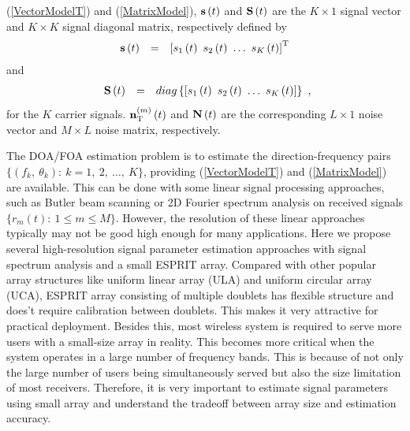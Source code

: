 \documentclass[a4paper,10pt,fleqn,twocolumn]{IEEEtran}
\newcommand{\bs}{{\bf s}}
\newcommand{\bn}{{\bf n}}
\newcommand{\bS}{{\bf S}}
\newcommand{\bN}{{\bf N}}
\begin{document}
(\ref{VectorModelT}) and (\ref{MatrixModel}), $\bs\left(t\right)$
and $\bS\left(t\right)$ are the $K\times 1$ signal vector and
$K\times K$ signal diagonal matrix, respectively defined by
\begin{equation}
\begin{array}{rcl}
\bs\left(t\right)&=&\left[s_{1}\left(t\right)\
s_{2}\left(t\right)\ \ldots\ s_{K}\left(t\right)\right]^{\rm T}
\end{array}
\end{equation}
\noindent and
\begin{equation}
\begin{array}{rcl}
\bS\left(t\right)&=&\mbox{diag}\left\{\left[s_{1}\left(t\right)\
s_{2}\left(t\right)\ \ldots\ s_{K}\left(t\right)\right]\right\}
\end{array},
\end{equation}
\noindent for the $K$ carrier signals. $\bn_{\rm
T}^{(m)}\left(t\right)$ and $\bN\left(t\right)$ are the
corresponding $L\times 1$ noise vector and $M\times L$ noise
matrix, respectively.

The DOA/FOA estimation problem is to estimate the
direction-frequency pairs $\{\left(f_{k},\ \theta_{k}\right):\
k=1,\ 2,\ \ldots,\ K\}$, providing (\ref{VectorModelT}) and
(\ref{MatrixModel}) are available. This can be done with some
linear signal processing approaches, such as Butler beam scanning
or 2D Fourier spectrum analysis on received signals
$\{r_{m}\left(t\right):\ 1\leq m\leq M \}$. However, the
resolution of these linear approaches typically may not be good
high enough for many applications. Here we propose several
high-resolution signal parameter estimation approaches with signal
spectrum analysis and a small ESPRIT array. Compared with other
popular array structures like uniform linear array (ULA) and
uniform circular array (UCA), ESPRIT array consisting of multiple
doublets has flexible structure and does't require calibration
between doublets. This makes it very attractive for practical
deployment. Besides this, most wireless system is required to
serve more users with a small-size array in reality. This becomes
more critical when the system operates in a large number of
frequency bands. This is because of not only the large number of
users being simultaneously served but also the size limitation of
most receivers. Therefore, it is very important to estimate signal
parameters using small array and understand the tradeoff between
array size and estimation accuracy.
\end{document}
